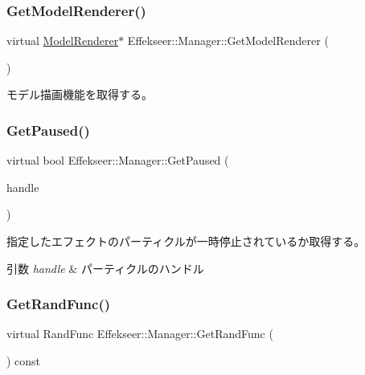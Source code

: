 \subsubsection{\texorpdfstring{Get\+Model\+Renderer()}{GetModelRenderer()}}
{\footnotesize\ttfamily virtual \mbox{\hyperlink{class_effekseer_1_1_model_renderer}{Model\+Renderer}}$\ast$ Effekseer\+::\+Manager\+::\+Get\+Model\+Renderer (\begin{DoxyParamCaption}{ }\end{DoxyParamCaption})\hspace{0.3cm}{\ttfamily [pure virtual]}}



モデル描画機能を取得する。 

\mbox{\label{class_effekseer_1_1_manager_af30924b879f3463d504991bf9780dfac}} 
\subsubsection{\texorpdfstring{Get\+Paused()}{GetPaused()}}
{\footnotesize\ttfamily virtual bool Effekseer\+::\+Manager\+::\+Get\+Paused (\begin{DoxyParamCaption}\item[{\mbox{\hyperlink{namespace_effekseer_afba58b8d812da862190e9bbfc040824a}{Handle}}}]{handle }\end{DoxyParamCaption})\hspace{0.3cm}{\ttfamily [pure virtual]}}



指定したエフェクトのパーティクルが一時停止されているか取得する。 


\begin{DoxyParams}{引数}
{\em handle} & パーティクルのハンドル \\
\hline
\end{DoxyParams}
\mbox{\label{class_effekseer_1_1_manager_a1694b05f00253f9468d4692e4e5f462b}} 
\subsubsection{\texorpdfstring{Get\+Rand\+Func()}{GetRandFunc()}}
{\footnotesize\ttfamily virtual Rand\+Func Effekseer\+::\+Manager\+::\+Get\+Rand\+Func (\begin{DoxyParamCaption}{ }\end{DoxyParamCaption}) const\hspace{0.3cm}{\ttfamily [pure virtual]}}



